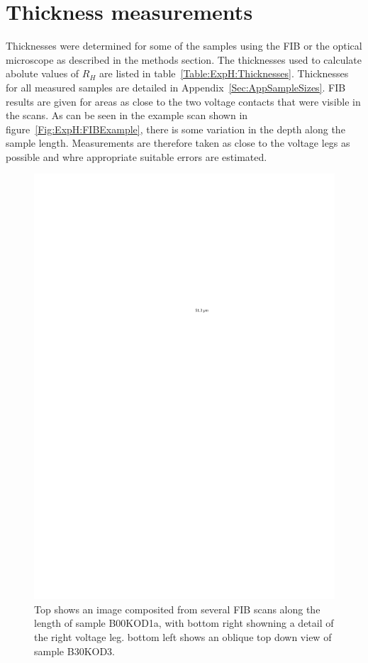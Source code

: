 \section{Thickness measurements}

Thicknesses were determined for some of the samples using the \ac{FIB} or the optical microscope as described in the methods section. The thicknesses used to calculate abolute values of $R_H$ are listed in table~\ref{Table:ExpH:Thicknesses}. Thicknesses for all measured samples are detailed in Appendix~\ref{Sec:AppSampleSizes}. \ac{FIB} results are given for areas as close to the two voltage contacts that were visible in the scans. As can be seen in the example scan shown in figure~\ref{Fig:ExpH:FIBExample}, there is some variation in the depth along the sample length. Measurements are therefore taken as close to the voltage legs as possible and whre appropriate suitable errors are estimated.
\begin{figure}[htbp]
	\begin{center}
		\includegraphics[scale=0.9]{CHapter-HallBSCO/FIgures/FIBExamples/FIBExamples}
		\caption{Top shows an image composited from several \ac{FIB} scans along the length of sample B00KOD1a, with bottom right showning a detail of the right voltage leg.  bottom left shows an oblique top down view of sample B30KOD3.}
		\label{Fig:ExpH:FIBExamples}
	\end{center}
\end{figure}

